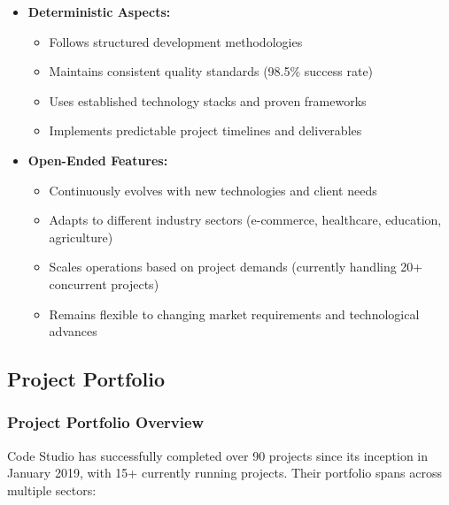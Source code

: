 \documentclass[12pt,a4paper]{article}
\begin{document}
\begin{itemize}
    \item \textbf{Deterministic Aspects:}
    \begin{itemize}
        \item Follows structured development methodologies
        \item Maintains consistent quality standards (98.5\% success rate)
        \item Uses established technology stacks and proven frameworks
        \item Implements predictable project timelines and deliverables
    \end{itemize}
    
    \item \textbf{Open-Ended Features:}
    \begin{itemize}
        \item Continuously evolves with new technologies and client needs
        \item Adapts to different industry sectors (e-commerce, healthcare, education, agriculture)
        \item Scales operations based on project demands (currently handling 20+ concurrent projects)
        \item Remains flexible to changing market requirements and technological advances
    \end{itemize}
\end{itemize}

\subsection{Project Portfolio}

\subsubsection{Project Portfolio Overview}
Code Studio has successfully completed over 90 projects since its inception in January 2019, with 15+ currently running projects. Their portfolio spans across multiple sectors:
\end{document}
